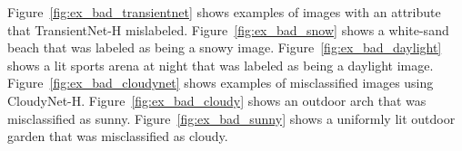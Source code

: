\documentclass[10pt,twocolumn,letterpaper]{article}
\newcommand{\todo}[1]{\textcolor{red}{todo: {\em #1}}}
\newcommand{\figref}[1]{Figure~\ref{fig:#1}}
\begin{document}
\figref{ex_bad_transientnet} shows examples of images with an attribute that
TransientNet-H mislabeled.  \figref{ex_bad_snow} shows a white-sand beach that
was labeled as being a snowy image.  \figref{ex_bad_daylight} shows a lit
sports arena at night that was labeled as being a daylight image.
\figref{ex_bad_cloudynet} shows examples of misclassified images using
CloudyNet-H.  \figref{ex_bad_cloudy} shows an outdoor arch that was
misclassified as sunny.  \figref{ex_bad_sunny} shows a uniformly lit outdoor
garden that was misclassified as cloudy.



%

\end{document}
